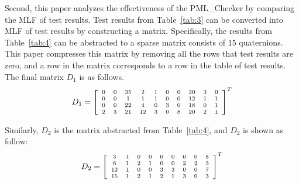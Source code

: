 Second, this paper analyzes the effectiveness of the PML\_Checker by comparing the MLF of test results. Test results from Table~\ref{tab:3} can be converted into MLF of test results by constructing a matrix. Specifically, the results from Table~\ref{tab:4} can be abstracted to a sparse matrix consists of $15$ quaternions. This paper compresses this matrix by removing all the rows that test results are zero, and a row in the matrix corresponds to a row in the table of test results. The final matrix $D_1$ is as follows.
\[
\scriptsize
D_1=\left[
\begin{array}{cccccccccc}
0 & 0 & 35 & 2 & 1 & 0 & 0 & 20 & 3 & 0\\
0 & 0 & 1  &  1 & 1 & 0 & 0 & 12 & 1 & 1\\
0 & 0 & 22 & 4 & 0 & 3 & 0 & 18 & 0 & 1 \\
2 & 3 & 21 & 12 & 3& 0 & 8 & 20 & 2 & 1  
\end{array}
\right]^{T}
\]

Similarly, $D_2$ is the matrix abstracted from Table~\ref{tab:4}, and $D_2$ is shown as follow:
\[
\scriptsize
D_2=\left[
\begin{array}{ccccccccc}
3 & 1 & 0 & 0 & 0 & 0 & 0 & 0 & 8 \\
6 & 1 & 2 &  1 & 0 & 0 & 2 & 2 & 3\\
12 & 1 & 0 & 0 & 3 & 3 & 0 & 0 & 7 \\
15 & 1 & 2& 1 & 2 & 1 & 3 & 0 & 3  
\end{array}
\right]^{T}
\]

